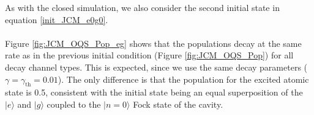 \documentclass[11pt]{article}
\newcounter{subsubsubsection}[subsubsection]
\begin{document}

As with the closed simulation, we also consider the second initial state in equation \eqref{init_JCM_e0g0}.\\
\\
Figure \ref{fig:JCM_OQS_Pop_eg} shows that the populations decay at the same rate as in the previous initial condition (Figure \ref{fig:JCM_OQS_Pop}) for all decay channel types. This is expected, since we use the same decay parameters ($\gamma= \gamma_{\scriptscriptstyle \text{th}} = 0.01$). The only difference is that the population for the excited atomic state is 0.5, consistent with the initial state being an equal superposition of the $|e\rangle$ and $|g\rangle$ coupled to the $|n=0\rangle$ Fock state of the cavity. \\
\end{document}

